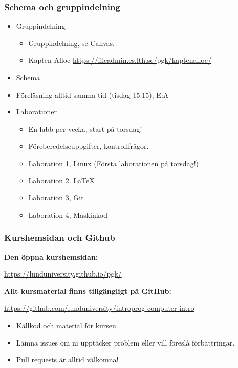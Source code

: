 \begin{frame}[fragile=singleslide]
	\frametitle{Schema och gruppindelning}

	\begin{itemize}
		\item Gruppindelning
		      \begin{itemize}
			      \item Gruppindelning, se Canvas.
			      \item Kapten Alloc \url{https://fileadmin.cs.lth.se/pgk/kaptenalloc/}
		      \end{itemize}
		\item Schema
		\item Föreläsning alltid samma tid (tisdag 15:15), E:A
		\item Laborationer
		      \begin{itemize}
			      \item En labb per vecka, start på torsdag!
			      \item Föreberedelseuppgifter, kontrollfrågor.
			      \item Laboration 1, Linux (Första laborationen på torsdag!)
			      \item Laboration 2. \LaTeX
			      \item Laboration 3, Git
			      \item Laboration 4, Maskinkod
		      \end{itemize}
	\end{itemize}
\end{frame}



\begin{frame}[fragile=singleslide]
	\frametitle{Kurshemsidan och Github}

	{\bf Den öppna kurshemsidan:}

	\smallskip
	\small\url{https://lunduniversity.github.io/pgk/}


	\bigskip


	{\bf Allt kursmaterial finns tillgängligt på GitHub:}

	\smallskip
	\small\url{https://github.com/lunduniversity/introprog-computer-intro}

	\smallskip
	\begin{itemize}
		\item Källkod och material för kursen.
		\item Lämna issues om ni upptäcker problem eller vill föreslå förbättringar.
		\item Pull requests är alltid välkomna!
	\end{itemize}
\end{frame}

